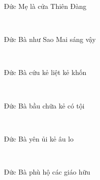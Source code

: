 \documentclass[12pt]{article}
\begin{document}
\begin{paracol}{2}
\begin{rightcolumn}
Đức Mẹ là cửa Thiên Đàng\\
\end{rightcolumn}

\begin{leftcolumn*}
\Large{\ \ \ }\\
\end{leftcolumn*}

\begin{rightcolumn}
Đức Bà như Sao Mai sáng vậy\\
\end{rightcolumn}

\begin{leftcolumn*}
\Large{\ \ \ }\\
\end{leftcolumn*}

\begin{rightcolumn}
Đức Bà cứu kẻ liệt kẻ khốn\\
\end{rightcolumn}

\begin{leftcolumn*}
\Large{\ \ \ }\\
\end{leftcolumn*}

\begin{rightcolumn}
Đức Bà bầu chữa kẻ có tội\\
\end{rightcolumn}

\begin{leftcolumn*}
\Large{\ \ \ }\\
\end{leftcolumn*}

\begin{rightcolumn}
Đức Bà yên ủi kẻ âu lo\\
\end{rightcolumn}

\begin{leftcolumn*}
\Large{\ \ \ }\\
\end{leftcolumn*}

\begin{rightcolumn}
Đức Bà phù hộ các giáo hữu\\
\end{rightcolumn}


\end{paracol}
\end{document}
